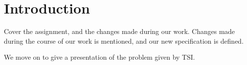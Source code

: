 \chapter{Introduction}

Cover the assignment, and the changes made during our work. Changes made during the course of our work is mentioned, and our new specification is defined.

We move on to give a presentation of the problem given by TSI.